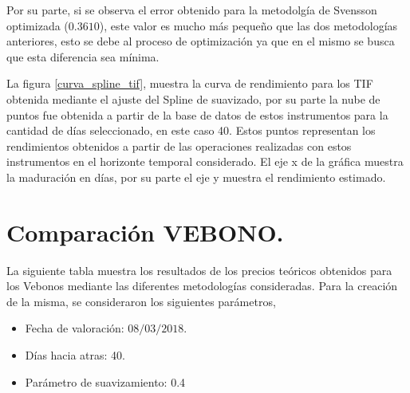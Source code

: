 \hspace{0.4cm} Por su parte, si se observa el error obtenido para la metodolg\'ia de Svensson optimizada ($0.3610$), este valor es mucho m\'as peque\~no que las dos metodolog\'ias anteriores, esto se debe al proceso de optimizaci\'on ya que en el mismo se busca que esta diferencia sea m\'inima.

\hspace{0.4cm} La figura \ref{curva_spline_tif}, muestra la curva de rendimiento para los TIF obtenida mediante el ajuste del Spline de suavizado, por su parte la nube de puntos fue obtenida a partir de la base de datos de estos instrumentos para la cantidad de d\'ias seleccionado, en este caso 40. Estos puntos representan los rendimientos obtenidos a partir de las operaciones realizadas con estos instrumentos en el horizonte temporal considerado. El eje x de la gr\'afica muestra la maduraci\'on en d\'ias, por su parte el eje y muestra el rendimiento estimado.

\newpage

\section{Comparaci\'on VEBONO.}


\hspace{0.4cm}La siguiente tabla muestra los resultados de los precios te\'oricos obtenidos para los Vebonos mediante las diferentes metodolog\'ias consideradas. Para la creaci\'on de la misma, se consideraron los siguientes par\'ametros,

\begin{itemize}
  \item Fecha de valoraci\'on: $08/03/2018$.
  \item D\'ias hacia atras: 40.
  \item Par\'ametro de suavizamiento: 0.4
\end{itemize}

